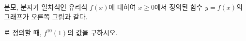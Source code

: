 \hspace*{2mm}\begin{minipage}[t]{\dimexpr\linewidth-2mm\relax}\vspace{0pt}
\noindent\begin{minipage}[t]{0.58\linewidth}\vspace{0pt}\raggedright 분모, 분자가 일차식인 유리식 $f(x)$에 대하여 $x\ge 0$에서 정의된 함수 $y=f(x)$의 그래프가 오른쪽 그림과 같다. \par\smallskip\end{minipage}\hfill\begin{minipage}[t]{0.4\linewidth}\vspace{0pt}\centering \resizebox{\ifdim\width>\linewidth\linewidth\else\width\fi}{!}{}\end{minipage}\par
\noindent {}\par{}\par\smallskip\noindent 로 정의할 때, $f^{10}(1)$의 값을 구하시오.\end{minipage}
